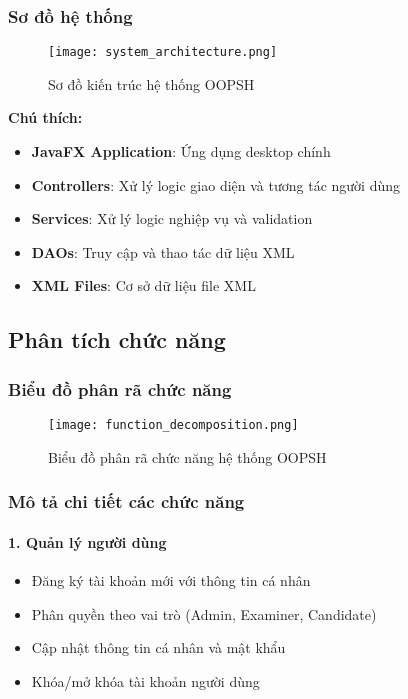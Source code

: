 \documentclass[12pt,a4paper]{article}
\begin{document}
\subsubsection{Sơ đồ hệ thống}

\begin{figure}[H]
\centering
\texttt{[image: system\_architecture.png]}
\caption{Sơ đồ kiến trúc hệ thống OOPSH}
\label{fig:system_architecture}
\end{figure}

\textbf{Chú thích:}
\begin{itemize}
    \item \textbf{JavaFX Application}: Ứng dụng desktop chính
    \item \textbf{Controllers}: Xử lý logic giao diện và tương tác người dùng
    \item \textbf{Services}: Xử lý logic nghiệp vụ và validation
    \item \textbf{DAOs}: Truy cập và thao tác dữ liệu XML
    \item \textbf{XML Files}: Cơ sở dữ liệu file XML
\end{itemize}

\subsection{Phân tích chức năng}

\subsubsection{Biểu đồ phân rã chức năng}

\begin{figure}[H]
\centering
\texttt{[image: function\_decomposition.png]}
\caption{Biểu đồ phân rã chức năng hệ thống OOPSH}
\label{fig:function_decomposition}
\end{figure}

\subsubsection{Mô tả chi tiết các chức năng}

\paragraph{1. Quản lý người dùng}
\begin{itemize}
    \item Đăng ký tài khoản mới với thông tin cá nhân
    \item Phân quyền theo vai trò (Admin, Examiner, Candidate)
    \item Cập nhật thông tin cá nhân và mật khẩu
    \item Khóa/mở khóa tài khoản người dùng
\end{itemize}
\end{document}
